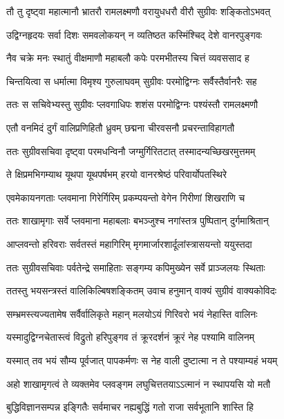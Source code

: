 
\twolineshloka
{तौ तु दृष्ट्वा महात्मानौ भ्रातरौ रामलक्ष्मणौ}
{वरायुधधरौ वीरौ सुग्रीवः शङ्कितोऽभवत्} %

\twolineshloka
{उद्विग्नहृदयः सर्वा दिशः समवलोकयन्}
{न व्यतिष्ठत कस्मिंश्चिद् देशे वानरपुङ्गवः} %

\twolineshloka
{नैव चक्रे मनः स्थातुं वीक्षमाणौ महाबलौ}
{कपेः परमभीतस्य चित्तं व्यवससाद ह} %

\twolineshloka
{चिन्तयित्वा स धर्मात्मा विमृश्य गुरुलाघवम्}
{सुग्रीवः परमोद्विग्नः सर्वैस्तैर्वानरैः सह} %

\twolineshloka
{ततः स सचिवेभ्यस्तु सुग्रीवः प्लवगाधिपः}
{शशंस परमोद्विग्नः पश्यंस्तौ रामलक्ष्मणौ} %

\twolineshloka
{एतौ वनमिदं दुर्गं वालिप्रणिहितौ ध्रुवम्}
{छद्मना चीरवसनौ प्रचरन्ताविहागतौ} %

\twolineshloka
{ततः सुग्रीवसचिवा दृष्ट्वा परमधन्विनौ}
{जग्मुर्गिरितटात् तस्मादन्यच्छिखरमुत्तमम्} %

\twolineshloka
{ते क्षिप्रमभिगम्याथ यूथपा यूथपर्षभम्}
{हरयो वानरश्रेष्ठं परिवार्योपतस्थिरे} %

\twolineshloka
{एवमेकायनगताः प्लवमाना गिरेर्गिरिम्}
{प्रकम्पयन्तो वेगेन गिरीणां शिखराणि च} %

\twolineshloka
{ततः शाखामृगाः सर्वे प्लवमाना महाबलाः}
{बभञ्जुश्च नगांस्तत्र पुष्पितान् दुर्गमाश्रितान्} %

\twolineshloka
{आप्लवन्तो हरिवराः सर्वतस्तं महागिरिम्}
{मृगमार्जारशार्दूलांस्त्रासयन्तो ययुस्तदा} %

\twolineshloka
{ततः सुग्रीवसचिवाः पर्वतेन्द्रे समाहिताः}
{सङ्गम्य कपिमुख्येन सर्वे प्राञ्जलयः स्थिताः} %

\twolineshloka
{ततस्तु भयसन्त्रस्तं वालिकिल्बिषशङ्कितम्}
{उवाच हनुमान् वाक्यं सुग्रीवं वाक्यकोविदः} %

\twolineshloka
{सम्भ्रमस्त्यज्यतामेष सर्वैर्वालिकृते महान्}
{मलयोऽयं गिरिवरो भयं नेहास्ति वालिनः} %

\twolineshloka
{यस्मादुद्विग्नचेतास्त्वं विद्रुतो हरिपुङ्गव}
{तं क्रूरदर्शनं क्रूरं नेह पश्यामि वालिनम्} %

\twolineshloka
{यस्मात् तव भयं सौम्य पूर्वजात् पापकर्मणः}
{स नेह वाली दुष्टात्मा न ते पश्याम्यहं भयम्} %

\twolineshloka
{अहो शाखामृगत्वं ते व्यक्तमेव प्लवङ्गम}
{लघुचित्ततयाऽऽत्मानं न स्थापयसि यो मतौ} %

\twolineshloka
{बुद्धिविज्ञानसम्पन्न इङ्गितैः सर्वमाचर}
{नह्यबुद्धिं गतो राजा सर्वभूतानि शास्ति हि} %

